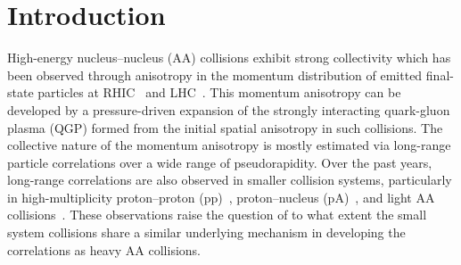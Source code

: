 
\section{Introduction}
\label{sec:intro}

High-energy nucleus--nucleus (AA) collisions exhibit strong collectivity which has been observed through anisotropy in the momentum distribution of emitted final-state particles at RHIC~\cite{Adams:2005dq,Adcox:2004mh,Arsene:2004fa,Back:2004je} and LHC~\cite{Abelev:2012di, Abelev:2014pua, ATLAS:2011ah}. This momentum anisotropy can be developed by a pressure-driven expansion of the strongly interacting quark-gluon plasma (QGP) formed from the initial spatial anisotropy in such collisions.
The collective nature of the momentum anisotropy is mostly estimated via long-range particle correlations over a wide range of pseudorapidity. Over the past years, long-range correlations are also observed in smaller collision systems, particularly in high-multiplicity proton--proton (pp)~\cite{ATLAS:2015hzw,Khachatryan:2015lva,Khachatryan:2016txc,Acharya:2019vdf,ATLAS:2017rtr}, proton--nucleus (pA)~\cite{ALICE:2012eyl,ATLAS:2014qaj,ATLAS:2016yzd,Khachatryan:2016ibd}, and light AA collisions~\cite{PHENIX:2018lia,Aidala:2017ajz}. These observations raise the question of to what extent the small system collisions share a similar underlying mechanism in developing the correlations as heavy AA collisions.

